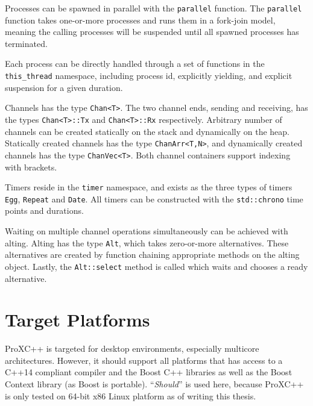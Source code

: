 Processes can be spawned in parallel with the \lstinline[style={CustomC++}]|parallel| function. The \lstinline[style={CustomC++}]|parallel| function takes one\hyp{}or\hyp{}more processes and runs them in a fork\hyp{}join model, meaning the calling processes will be suspended until all spawned processes has terminated.

Each process can be directly handled through a set of functions in the \lstinline[style={CustomC++}]|this_thread| namespace, including process id, explicitly yielding, and explicit suspension for a given duration.

Channels has the type \lstinline[style={CustomC++}]|Chan<T>|. The two channel ends, sending and receiving, has the types \lstinline[style={CustomC++}]|Chan<T>::Tx| and \lstinline[style={CustomC++}]|Chan<T>::Rx| respectively. Arbitrary number of channels can be created statically on the stack and dynamically on the heap. Statically created channels has the type \lstinline[style={CustomC++}]|ChanArr<T,N>|, and dynamically created channels has the type \lstinline[style={CustomC++}]|ChanVec<T>|. Both channel containers support indexing with brackets.

Timers reside in the \lstinline[style={CustomC++}]|timer| namespace, and exists as the three types of timers \lstinline[style={CustomC++}]|Egg|, \lstinline[style={CustomC++}]|Repeat| and \lstinline[style={CustomC++}]|Date|. All timers can be constructed with the \lstinline[style={CustomC++}]|std::chrono| time points and durations.

Waiting on multiple channel operations simultaneously can be achieved with alting. Alting has the type \lstinline[style={CustomC++}]|Alt|, which takes zero\hyp{}or\hyp{}more alternatives. These alternatives are created by function chaining appropriate methods on the alting object. Lastly, the \lstinline[style={CustomC++}]|Alt::select| method is called which waits and chooses a ready alternative.


\section{Target Platforms}
\label{sec:target_platforms}


ProXC++ is targeted for desktop environments, especially multicore architectures. However, it should support all platforms that has access to a C++14 compliant compiler and the Boost C++ libraries \citep{boost2017boost} as well as the Boost Context library \citep{kowalke2017boost} (as Boost is portable). ``\textit{Should}'' is used here, because ProXC++ is only tested on 64\hyp{}bit x86 Linux platform as of writing this thesis.


